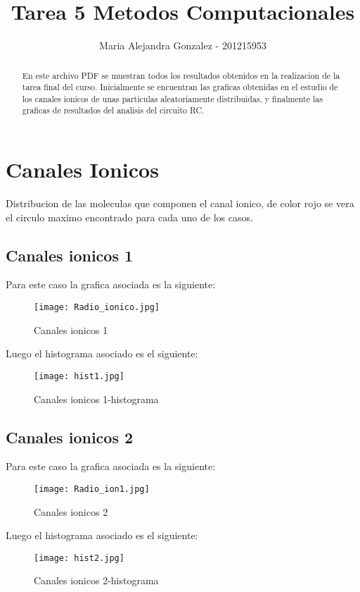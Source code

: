 \documentclass{article}
\begin{document}
\title{Tarea 5 Metodos Computacionales}
\author{Maria Alejandra Gonzalez - 201215953}

\maketitle

\begin{abstract}
En este archivo PDF se muestran todos los resultados obtenidos en la realizacion de la tarea final del curso.
Inicialmente se encuentran las graficas obtenidas en el estudio de los canales ionicos de unas particulas aleatoriamente distribuidas, y finalmente las graficas de resultados del analisis del circuito RC.
\end{abstract}

\section{Canales Ionicos}
Distribucion de las moleculas que componen el canal ionico, de color rojo se vera el circulo maximo encontrado para cada uno de los casos.

\subsection{Canales ionicos 1}
Para este caso la grafica asociada es la siguiente:
\begin{figure}[h!]
   \centering
    \texttt{[image: Radio\_ionico.jpg]}
    \caption{Canales ionicos 1}
    \label{1}
\end{figure}

Luego el histograma asociado es el siguiente:

\begin{figure}[h!]
   \centering
    \texttt{[image: hist1.jpg]}
    \caption{Canales ionicos 1-histograma}
    \label{2}
\end{figure}

\subsection{Canales ionicos 2}
Para este caso la grafica asociada es la siguiente:
\begin{figure}[h!]
   \centering
    \texttt{[image: Radio\_ion1.jpg]}
    \caption{Canales ionicos 2}
    \label{3}
\end{figure}
Luego el histograma asociado es el siguiente:
\begin{figure}[h!]
   \centering
    \texttt{[image: hist2.jpg]}
    \caption{Canales ionicos 2-histograma}
    \label{4}
\end{figure}
\end{document}
